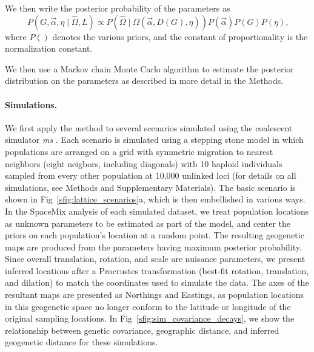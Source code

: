 \documentclass[10pt,letterpaper]{article}
\begin{document}
We then write the posterior probability of the parameters as 
\begin{equation}
\label{eq:cyol_prob}
P \left( G, \vec{\alpha}, \eta \mid \widehat{\Omega}, L \right) \propto  
	P \left( \widehat{\Omega}  \mid \Omega(\vec{\alpha},{D}(G),\eta ) \right) P(\vec{\alpha}) P(G) P(\eta) \text{,}
\end{equation}
where $P( )$ denotes the various priors, and the constant of proportionality is the normalization constant.  

We then use a Markov chain Monte Carlo algorithm to estimate the posterior distribution on the parameters as described in more detail in the Methods.


\paragraph{Simulations.} 
We first apply the method to several scenarios simulated using the coalescent simulator \textit{ms} \cite{Hudson2002}.  
Each scenario is simulated using a stepping stone model in which populations are arranged on a grid with symmetric migration 
to nearest neighbors (eight neigbors, including diagonals)
with 10 haploid individuals sampled from every other population at 10,000 unlinked loci (for details on all simulations, see Methods and Supplementary Materials).  
The basic scenario is shown in Fig\ \ref{sfig:lattice_scenarios}a, 
which is then embellished in various ways.
In the SpaceMix analysis of each simulated dataset, 
we treat population locations as unknown parameters to be estimated as part of the model, 
and center the priors on each population's location at a random point.
The resulting geogenetic maps are produced from the parameters having maximum posterior probability.
Since overall translation, rotation, and scale are nuisance parameters,
we present inferred locations after a Procrustes transformation
(best-fit rotation, translation, and dilation) 	
to match the coordinates used to simulate the data.  
The axes of the resultant maps are presented as Northings and Eastings, 
as population locations in this geogenetic space no longer conform 
to the latitude or longitude of the original sampling locations.
In Fig\ \ref{sfig:sim_covariance_decays}, we show the relationship between genetic covariance, 
geographic distance, and inferred geogenetic distance for these simulations.
%
\end{document}
